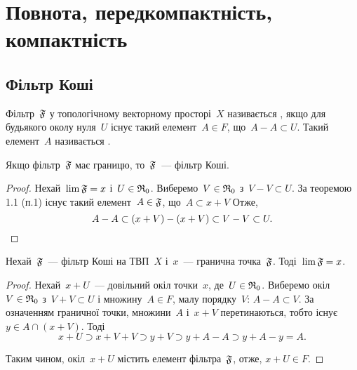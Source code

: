 \chapter{Повнота, передкомпактність, компактність}

\section{Фільтр Коші}

\begin{definition}
    Фільтр~$\frak F$ у топологічному векторному просторі~$X$ називається , якщо для будьякого околу нуля~$U$ існує такий елемент~$A \in F$, що~$A - A \subset U$. Такий елемент~$A$ називається .
\end{definition}

\begin{theorem}
    Якщо фільтр~$\frak F$ має границю, то~$\frak F$~--- фільтр Коші.
\end{theorem}

\begin{proof}
    Нехай~$\lim \frak F = x$ і~$U \in \frak R_0$. Виберемо~$V \in \frak R_0$ з~$V - V \subset U$. За теоремою 1.1 (п.1) існує такий елемент~$A \in \frak F$, що~$A \subset x + V$ Отже,
    \begin{equation*}
        A - A \subset(x + V) -(x + V) \subset V - V \subset U. \qedhere
    \end{equation*}
\end{proof}

\begin{theorem}
    Нехай~$\frak F$~--- фільтр Коші на ТВП~$X$ і~$x$~--- гранична точка~$\frak F$. Тоді~$\lim \frak F = x$.
\end{theorem}

\begin{proof}
    Нехай~$x + U$~--- довільний окіл точки~$x$, де~$U \in \frak R_0$. Виберемо окіл~$V \in \frak R_0$ з~$V + V \subset U$ і множину~$A \in F$, малу порядку~$V$: $A - A \subset V$. За означенням граничної точки, множини~$A$ і~$x + V$ перетинаються, тобто існує~$y \in A \cap(x + V)$. Тоді
    \begin{equation*}
        x + U \supset x + V + V \supset y + V \supset y + A - A \supset y + A - y = A.
    \end{equation*}

    Таким чином, окіл~$x + U$ містить елемент фільтра~$\frak F$, отже, $x + U \in F$.
\end{proof}

